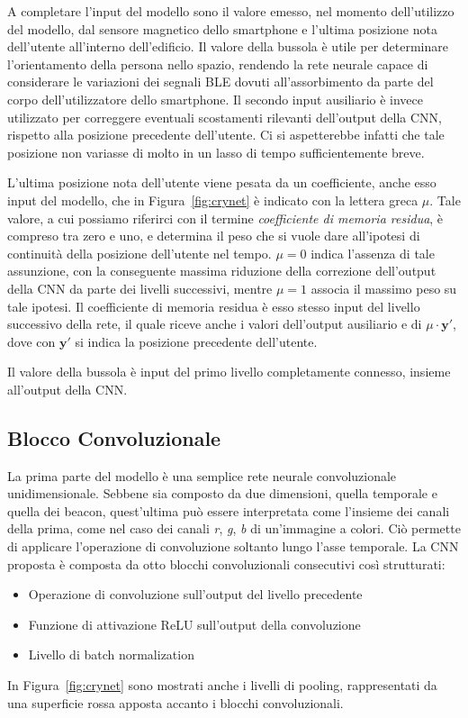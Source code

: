 A completare l'input del modello sono il valore emesso, nel momento
dell'utilizzo del modello, dal sensore magnetico dello smartphone e
l'ultima posizione nota dell'utente all'interno dell'edificio. Il valore della
bussola è utile per determinare l'orientamento della persona nello spazio,
rendendo la rete neurale capace di considerare le variazioni dei segnali BLE
dovuti all'assorbimento da parte del corpo dell'utilizzatore dello smartphone.
Il secondo input ausiliario è invece utilizzato per correggere eventuali
scostamenti rilevanti dell'output della CNN, rispetto alla posizione precedente
dell'utente. Ci si aspetterebbe infatti che tale posizione non variasse di
molto in un lasso di tempo sufficientemente breve.

L'ultima posizione nota dell'utente viene pesata da un coefficiente, anche esso
input del modello, che in Figura~\ref{fig:crynet} è indicato con la lettera
greca \(\mu\). Tale valore, a cui possiamo riferirci con il termine
\emph{coefficiente di memoria residua}, è compreso tra zero e uno, e determina
il peso che si vuole dare all'ipotesi di continuità della posizione dell'utente
nel tempo.  \(\mu = 0\) indica l'assenza di tale assunzione, con la conseguente
massima riduzione della correzione dell'output della CNN da parte dei livelli
successivi, mentre \(\mu = 1 \) associa il massimo peso su tale ipotesi. Il
coefficiente di memoria residua è esso stesso input del livello successivo
della rete, il quale riceve anche i valori dell'output ausiliario e di \( \mu
  \cdot \bm y'\), dove con \(\bm y'\) si indica la posizione precedente
dell'utente.

Il valore della bussola è input del primo livello completamente connesso,
insieme all'output della CNN\@.
\subsection{Blocco Convoluzionale}
La prima parte del modello è una semplice rete neurale convoluzionale
unidimensionale. Sebbene sia composto da due dimensioni, quella temporale e
quella dei beacon, quest'ultima può essere interpretata come l'insieme dei
canali della prima, come nel caso dei canali \emph{r}, \emph{g}, \emph{b} di
un'immagine a colori. Ciò permette di applicare l'operazione di convoluzione
soltanto lungo l'asse temporale.
La CNN proposta è composta da otto blocchi convoluzionali consecutivi così
strutturati:
\begin{itemize}
    \item Operazione di convoluzione sull'output del livello precedente
    \item Funzione di attivazione ReLU sull'output della convoluzione
    \item Livello di batch normalization
\end{itemize}
In Figura~\ref{fig:crynet} sono mostrati anche i livelli di pooling,
rappresentati da una superficie rossa apposta accanto i blocchi
convoluzionali.

